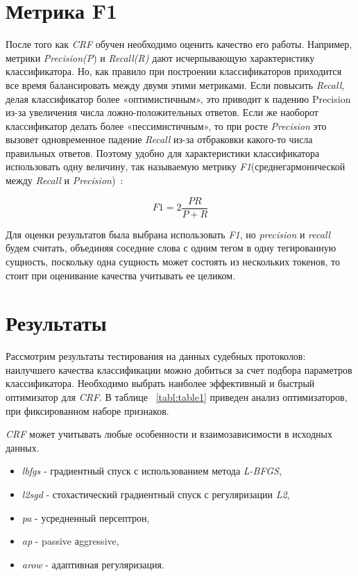 \documentclass{csmathnotes}
\begin{document}
\section*{Метрика F1}
После того как \emph{CRF} обучен необходимо оценить качество его работы. Например, метрики \emph{Precision(P}) и \emph{Recall(R)} дают исчерпывающую характеристику классификатора. Но, как правило при построении классификаторов приходится все время балансировать между двумя этими метриками. Если повысить \emph{Recall}, делая классификатор более «оптимистичным», это приводит к падению Precision из-за увеличения числа ложно-положительных ответов. Если же наоборот классификатор делать более «пессимистичным», то при росте \emph{Precision} это вызовет одновременное падение \emph{Recall} из-за отбраковки какого-то числа правильных ответов. Поэтому удобно для характеристики классификатора использовать одну величину, так называемую метрику \emph{F1}(среднегармонической между \emph{Recall} и \emph{Precision})~\cite{А1}:

\begin{equation}
F1 = 2\frac{P R}{P + R} 
\end{equation}

Для оценки результатов была выбрана использовать \emph{F1}, но \emph{precision} и \emph{recall} будем считать, объединяя соседние слова с одним тегом в одну тегированную сущность, поскольку одна сущность может состоять из нескольких токенов, то стоит при оценивание качества учитывать ее целиком. 

\section*{Результаты}
Рассмотрим результаты тестирования на данных судебных протоколов: наилучшего качества классификации можно добиться за счет подбора параметров классификатора. Необходимо выбрать наиболее эффективный и быстрый оптимизатор для \emph{CRF}. В таблице ~\ref{tabl:table1} приведен анализ оптимизаторов, при фиксированном наборе признаков.


\emph{CRF} может учитывать любые особенности и взаимозависимости в исходных данных.
\begin{itemize}
	\item \emph{lbfgs} - градиентный спуск с использованием метода 
	\emph{L-BFGS},
	\item \emph{l2sgd} - стохастический  градиентный спуск с регуляризации \emph{L2},
	\item \emph{pa} - усредненный персептрон,
	\item \emph{ap} - passive аggressive,
	\item \emph{arow} - адаптивная регуляризация.
\end{itemize}
\end{document}
